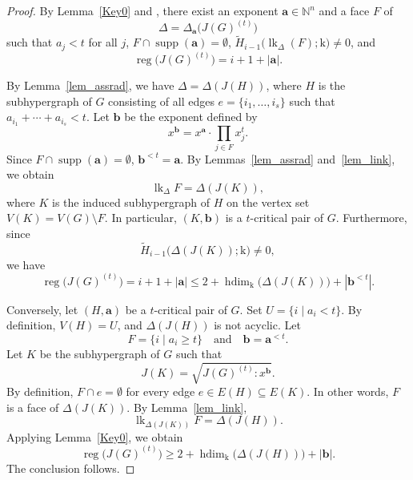 \documentclass[12pt,amscd]{amsart}
\theoremstyle{definition}
\DeclareMathOperator{\hdim}{hdim}
\DeclareMathOperator{\supp}{supp}
\DeclareMathOperator{\lk}{lk}
\DeclareMathOperator{\reg}{reg}
\def\b {\mathbf b}
\def\a {\mathbf a}
\def\k {\mathrm k}
\def\h {\widetilde{H}}
\def\h {\widetilde{H}}
\def\NN {\mathbb{N}}
\begin{document}
\begin{proof}
By Lemma~\ref{Key0} and \cite[Remark 2.13]{MV3}, there exist an exponent $\a \in \NN^n$ and a face $F$ of
\[
\Delta = \Delta_{\a}\bigl(J(G)^{(t)}\bigr)
\]
such that $a_j < t$ for all $j$, $F \cap \supp(\a) = \emptyset$,
$\h_{i-1}\bigl(\lk_{\Delta}(F); \k\bigr) \neq 0$, and
\[
\reg\bigl(J(G)^{(t)}\bigr) = i + 1 + |\a|.
\]

By Lemma~\ref{lem_assrad}, we have $\Delta = \Delta(J(H))$, where $H$ is the subhypergraph of $G$ consisting of all edges
$e = \{i_1, \ldots, i_s\}$ such that $a_{i_1} + \cdots + a_{i_s} < t.$ Let $\b$ be the exponent defined by
\[
x^\b = x^\a \cdot \prod_{j \in F} x_j^t.
\]
Since $F \cap \supp(\a) = \emptyset$, $\b^{<t} = \a$. By Lemmas~\ref{lem_assrad} and~\ref{lem_link}, we obtain
\[
\lk_{\Delta}F = \Delta(J(K)),
\]
where $K$ is the induced subhypergraph of $H$ on the vertex set $V(K) = V(G) \setminus F.$ In particular, $(K,\b)$ is a $t$-critical pair of $G$. Furthermore, since
\[
\h_{i-1}\bigl(\Delta(J(K)); \k\bigr) \neq 0,
\]
we have
\[
\reg\bigl(J(G)^{(t)}\bigr)
=
i + 1 + |\a|
\le
2 + \hdim_{\k}\bigl(\Delta(J(K))\bigr) + |\b^{<t}|.
\]

Conversely, let $(H,\a)$ be a $t$-critical pair of $G$. Set $U = \{i \mid a_i < t\}.$ By definition, $V(H) = U$, and $\Delta(J(H))$ is not acyclic. Let
\[
F = \{i \mid a_i \ge t\}
\quad \text{and} \quad
\b = \a^{<t}.
\]
Let $K$ be the subhypergraph of $G$ such that
\[
J(K) = \sqrt{J(G)^{(t)} : x^\b}.
\]
By definition, $F \cap e = \emptyset$ for every edge $e \in E(H) \subseteq E(K)$. In other words, $F$ is a face of $\Delta(J(K))$. By Lemma~\ref{lem_link},
\[
\lk_{\Delta(J(K))} F = \Delta(J(H)).
\]
Applying Lemma~\ref{Key0}, we obtain
\[
\reg\bigl(J(G)^{(t)}\bigr)
\ge
2 + \hdim_{\k}\bigl(\Delta(J(H))\bigr) + |\b|.
\]
The conclusion follows.
\end{proof}
\end{document}
